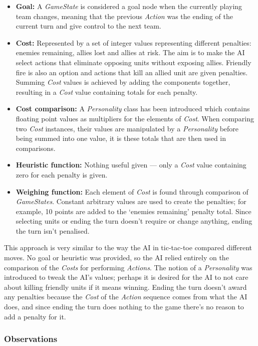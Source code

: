 \documentclass[11pt, a4paper]{report}
\begin{document}
\begin{itemize}
  \item \textbf{Goal:} A \emph{GameState} is considered a goal node when the currently playing team changes, meaning that the previous \emph{Action} was the ending of the current turn and give control to the next team.
  \item \textbf{Cost:} Represented by a set of integer values representing different penalties: enemies remaining, allies lost and allies at risk. The aim is to make the AI select actions that eliminate opposing units without exposing allies. Friendly fire is also an option and actions that kill an allied unit are given penalties. Summing \emph{Cost} values is achieved by adding the components together, resulting in a \emph{Cost} value containing totals for each penalty.
  \item \textbf{Cost comparison:} A \emph{Personality} class has been introduced which contains floating point values as multipliers for the elements of \emph{Cost}. When comparing two \emph{Cost} instances, their values are manipulated by a \emph{Personality} before being summed into one value, it is these totals that are then used in comparisons.
  \item \textbf{Heuristic function:} Nothing useful given --- only a \emph{Cost} value containing zero for each penalty is given.
  \item \textbf{Weighing function:} Each element of \emph{Cost} is found through comparison of \emph{GameStates}. Constant arbitrary values are used to create the penalties; for example, 10 points are added to the `enemies remaining' penalty total. Since selecting units or ending the turn doesn't require or change anything, ending the turn isn't penalised. 
\end{itemize}

This approach is very similar to the way the AI in tic-tac-toe compared different moves. No goal or heuristic was provided, so the AI relied entirely on the comparison of the \emph{Costs} for performing \emph{Actions}. The notion of a \emph{Personality} was introduced to tweak the AI's values; perhaps it is desired for the AI to not care about killing friendly units if it means winning. Ending the turn doesn't award any penalties because the \emph{Cost} of the \emph{Action} sequence comes from what the AI does, and since ending the turn does nothing to the game there's no reason to add a penalty for it.

\subsubsection{Observations}
\end{document}
